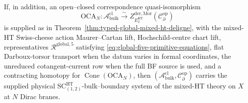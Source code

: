 \begin{thm}
If, in addition, an open--closed correspondence quasi-isomorphism
\[
  \mathrm{OCA}_N\colon\mathcal A^{\mathrm{cl}}_{\mathrm{bulk}}
  \xrightarrow{\sim}
  Z^{\mathrm{der},\mathrm{Mor}}_{E_2^{\mathrm{HT}}}
  (\mathcal C^{\mathrm{op}}_\partial)
\]
is supplied as in Theorem~\ref{thm:typed-global-mixed-ht-deligne}, with
the mixed-HT Swiss-cheese action Maurer--Cartan lift, Hochschild-centre
chart lift, representatives \(\mathcal R^{\mathrm{global},5}\)
satisfying \eqref{eq:global-five-primitive-equations}, flat
Darboux-torsor transport when the datum varies in formal coordinates,
the unreduced cotangent-current row when the full BF source is used, and
a contracting homotopy for \(\operatorname{Cone}(\mathrm{OCA}_N)\), then
\((\mathcal A^{\mathrm{cl}}_{\mathrm{bulk}},
\mathcal C^{\mathrm{op}}_\partial)\) carries the supplied physical
\(\mathrm{SC}^{\mathrm{HT}}_{(1,2)}\)-bulk--boundary system of the
mixed-HT theory on \(X\) at \(N\) Dirac branes.
\end{thm}

